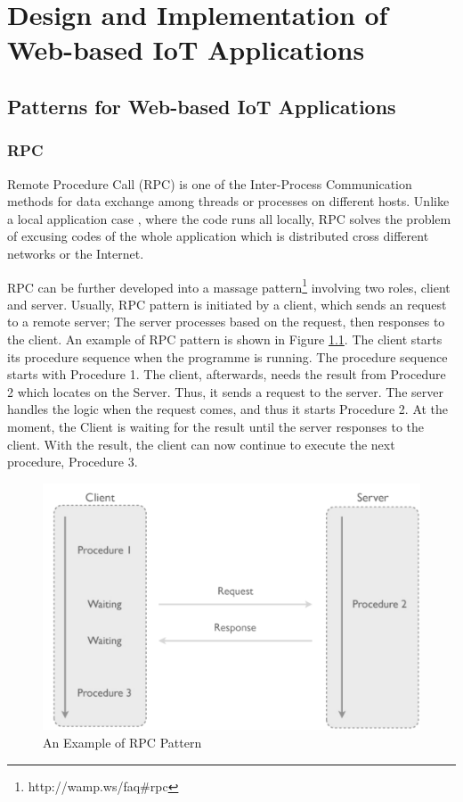 \chapter{Design and Implementation of Web-based IoT Applications}
\label{chapter:Design-and-Implementation-of-Web-based-IoT-Applications}

\section{Patterns for Web-based IoT Applications}
\label{chapter:Patternsforweb-basedIoTapplications}

\subsection{RPC}
Remote Procedure Call (RPC) is one of the Inter-Process Communication methods for data exchange among threads or processes on different hosts. Unlike a local application case \cite{srinivasan1995rpc}, where the code runs all locally, RPC solves the problem of excusing codes of the whole application which is distributed cross different networks or the Internet.

RPC can be further developed into a massage pattern\footnote{http://wamp.ws/faq\#rpc} involving two roles, client and server. Usually, RPC pattern is initiated by a client, which sends an request to a remote server; The server processes based on the request, then responses to the client. An example of RPC pattern is shown in Figure \ref{fig:RPC-pattern}. The client starts its procedure sequence when the programme is running. The procedure sequence starts with Procedure 1. The client, afterwards, needs the result from Procedure 2 which locates on the Server. Thus, it sends a request to the server. The server handles the logic when the request comes, and thus it starts Procedure 2. At the moment, the Client is waiting for the result until the server responses to the client. With the result, the client can now continue to execute the next procedure, Procedure 3.  

\begin{figure}[ht]
  \begin{center}
    \includegraphics[width=1\textwidth]{images/RPC-pattern.pdf}
    \caption{An Example of RPC Pattern}
    \label{fig:RPC-pattern}
  \end{center}
\end{figure}

